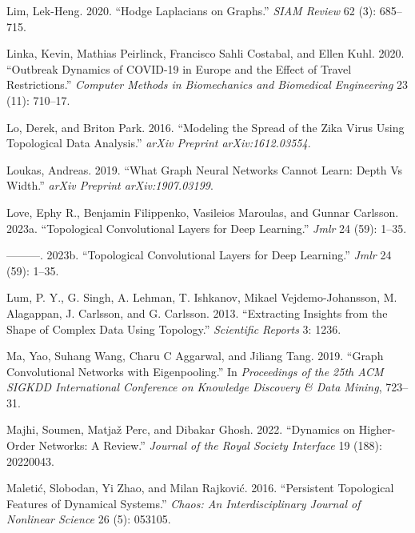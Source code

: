 \documentclass[
  12pt,
]{krantz}
\newlength{\cslhangindent}
\newenvironment{CSLReferences}[2] %
 {\begin{list}{}{%
  \setlength{\itemindent}{0pt}
  \setlength{\leftmargin}{0pt}
  \setlength{\parsep}{0pt}
  \ifodd #1
   \setlength{\leftmargin}{\cslhangindent}
   \setlength{\itemindent}{-1\cslhangindent}
  \fi
  \setlength{\itemsep}{#2\baselineskip}}}
 {\end{list}}
\begin{document}
\begin{CSLReferences}{1}{0}
Lim, Lek-Heng. 2020. {``{H}odge {L}aplacians on Graphs.''} \emph{{SIAM}
Review} 62 (3): 685--715.

Linka, Kevin, Mathias Peirlinck, Francisco Sahli Costabal, and Ellen
Kuhl. 2020. {``Outbreak Dynamics of {COVID}-19 in {E}urope and the
Effect of Travel Restrictions.''} \emph{Computer Methods in Biomechanics
and Biomedical Engineering} 23 (11): 710--17.

Lo, Derek, and Briton Park. 2016. {``Modeling the Spread of the {Z}ika
Virus Using Topological Data Analysis.''} \emph{arXiv Preprint
arXiv:1612.03554}.

Loukas, Andreas. 2019. {``What Graph Neural Networks Cannot Learn: Depth
Vs Width.''} \emph{arXiv Preprint arXiv:1907.03199}.

Love, Ephy R., Benjamin Filippenko, Vasileios Maroulas, and Gunnar
Carlsson. 2023a. {``Topological Convolutional Layers for Deep
Learning.''} \emph{Jmlr} 24 (59): 1--35.

---------. 2023b. {``Topological Convolutional Layers for Deep
Learning.''} \emph{Jmlr} 24 (59): 1--35.

Lum, P. Y., G. Singh, A. Lehman, T. Ishkanov, Mikael Vejdemo-Johansson,
M. Alagappan, J. Carlsson, and G. Carlsson. 2013. {``Extracting Insights
from the Shape of Complex Data Using Topology.''} \emph{Scientific
Reports} 3: 1236.

Ma, Yao, Suhang Wang, Charu C Aggarwal, and Jiliang Tang. 2019. {``Graph
Convolutional Networks with Eigenpooling.''} In \emph{Proceedings of the
25th ACM SIGKDD International Conference on Knowledge Discovery \& Data
Mining}, 723--31.

Majhi, Soumen, Matjaž Perc, and Dibakar Ghosh. 2022. {``Dynamics on
Higher-Order Networks: A Review.''} \emph{Journal of the Royal Society
Interface} 19 (188): 20220043.

Maletić, Slobodan, Yi Zhao, and Milan Rajković. 2016. {``Persistent
Topological Features of Dynamical Systems.''} \emph{Chaos: An
Interdisciplinary Journal of Nonlinear Science} 26 (5): 053105.


\end{CSLReferences}
\end{document}
